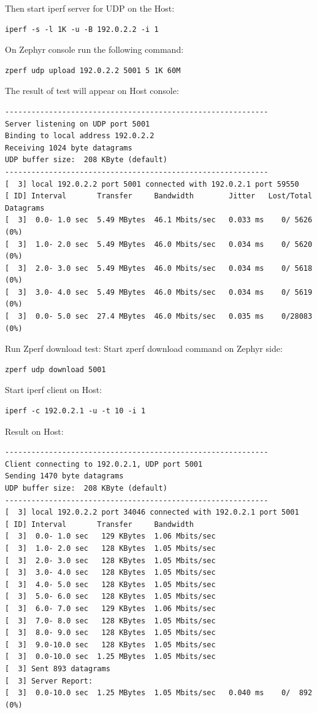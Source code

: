 \documentclass[11pt,a4paper,oneside]{article}
\begin{document}
Then start iperf server for UDP on the Host:
\begin{lstlisting}
iperf -s -l 1K -u -B 192.0.2.2 -i 1
\end{lstlisting}

On Zephyr console run the following command:
\begin{lstlisting}
zperf udp upload 192.0.2.2 5001 5 1K 60M
\end{lstlisting}

The result of test will appear on Host console:
\begin{lstlisting}
------------------------------------------------------------
Server listening on UDP port 5001
Binding to local address 192.0.2.2
Receiving 1024 byte datagrams
UDP buffer size:  208 KByte (default)
------------------------------------------------------------
[  3] local 192.0.2.2 port 5001 connected with 192.0.2.1 port 59550
[ ID] Interval       Transfer     Bandwidth        Jitter   Lost/Total Datagrams
[  3]  0.0- 1.0 sec  5.49 MBytes  46.1 Mbits/sec   0.033 ms    0/ 5626 (0%)
[  3]  1.0- 2.0 sec  5.49 MBytes  46.0 Mbits/sec   0.034 ms    0/ 5620 (0%)
[  3]  2.0- 3.0 sec  5.49 MBytes  46.0 Mbits/sec   0.034 ms    0/ 5618 (0%)
[  3]  3.0- 4.0 sec  5.49 MBytes  46.0 Mbits/sec   0.034 ms    0/ 5619 (0%)
[  3]  0.0- 5.0 sec  27.4 MBytes  46.0 Mbits/sec   0.035 ms    0/28083 (0%)
\end{lstlisting}

Run Zperf download test:
Start zperf download command on Zephyr side:
\begin{lstlisting}
zperf udp download 5001
\end{lstlisting}

Start iperf client on Host:
\begin{lstlisting}
iperf -c 192.0.2.1 -u -t 10 -i 1
\end{lstlisting}

Result on Host:
\begin{lstlisting}
------------------------------------------------------------
Client connecting to 192.0.2.1, UDP port 5001
Sending 1470 byte datagrams
UDP buffer size:  208 KByte (default)
------------------------------------------------------------
[  3] local 192.0.2.2 port 34046 connected with 192.0.2.1 port 5001
[ ID] Interval       Transfer     Bandwidth
[  3]  0.0- 1.0 sec   129 KBytes  1.06 Mbits/sec
[  3]  1.0- 2.0 sec   128 KBytes  1.05 Mbits/sec
[  3]  2.0- 3.0 sec   128 KBytes  1.05 Mbits/sec
[  3]  3.0- 4.0 sec   128 KBytes  1.05 Mbits/sec
[  3]  4.0- 5.0 sec   128 KBytes  1.05 Mbits/sec
[  3]  5.0- 6.0 sec   128 KBytes  1.05 Mbits/sec
[  3]  6.0- 7.0 sec   129 KBytes  1.06 Mbits/sec
[  3]  7.0- 8.0 sec   128 KBytes  1.05 Mbits/sec
[  3]  8.0- 9.0 sec   128 KBytes  1.05 Mbits/sec
[  3]  9.0-10.0 sec   128 KBytes  1.05 Mbits/sec
[  3]  0.0-10.0 sec  1.25 MBytes  1.05 Mbits/sec
[  3] Sent 893 datagrams
[  3] Server Report:
[  3]  0.0-10.0 sec  1.25 MBytes  1.05 Mbits/sec   0.040 ms    0/  892 (0%)
\end{lstlisting}
\end{document}
